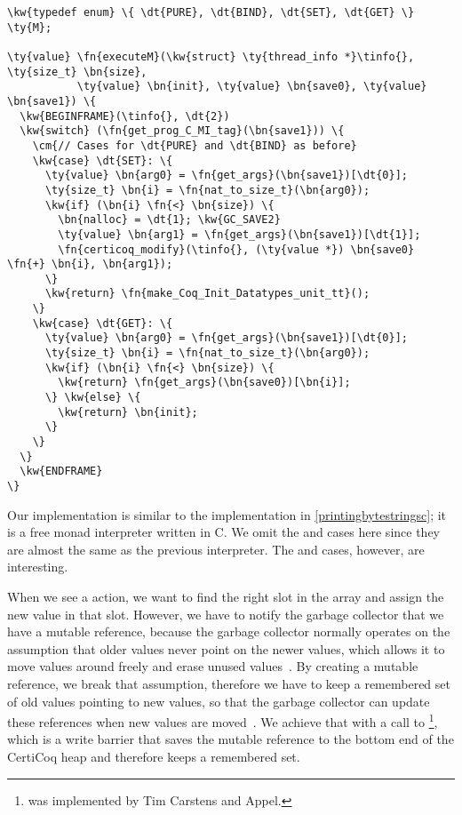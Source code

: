 \begin{Verbatim}
\kw{typedef enum} \{ \dt{PURE}, \dt{BIND}, \dt{SET}, \dt{GET} \} \ty{M};

\ty{value} \fn{executeM}(\kw{struct} \ty{thread_info *}\tinfo{}, \ty{size_t} \bn{size}, 
           \ty{value} \bn{init}, \ty{value} \bn{save0}, \ty{value} \bn{save1}) \{
  \kw{BEGINFRAME}(\tinfo{}, \dt{2})
  \kw{switch} (\fn{get_prog_C_MI_tag}(\bn{save1})) \{
    \cm{// Cases for \dt{PURE} and \dt{BIND} as before}
    \kw{case} \dt{SET}: \{
      \ty{value} \bn{arg0} = \fn{get_args}(\bn{save1})[\dt{0}];
      \ty{size_t} \bn{i} = \fn{nat_to_size_t}(\bn{arg0});
      \kw{if} (\bn{i} \fn{<} \bn{size}) \{
        \bn{nalloc} = \dt{1}; \kw{GC_SAVE2}
        \ty{value} \bn{arg1} = \fn{get_args}(\bn{save1})[\dt{1}];
        \fn{certicoq_modify}(\tinfo{}, (\ty{value *}) \bn{save0} \fn{+} \bn{i}, \bn{arg1});
      \}
      \kw{return} \fn{make_Coq_Init_Datatypes_unit_tt}();
    \}
    \kw{case} \dt{GET}: \{
      \ty{value} \bn{arg0} = \fn{get_args}(\bn{save1})[\dt{0}];
      \ty{size_t} \bn{i} = \fn{nat_to_size_t}(\bn{arg0});
      \kw{if} (\bn{i} \fn{<} \bn{size}) \{
        \kw{return} \fn{get_args}(\bn{save0})[\bn{i}];
      \} \kw{else} \{
        \kw{return} \bn{init};
      \}
    \}
  \}
  \kw{ENDFRAME}
\}
\end{Verbatim}

Our  implementation is similar to the  implementation in \autoref{printingbytestringsc}; it is a free monad interpreter written in C. We omit the  and  cases here since they are almost the same as the previous interpreter.
The  and  cases, however, are interesting.

When we see a  action, we want to find the right slot in the array and assign the new value in that slot. However, we have to notify the garbage collector that we have a mutable reference, because the garbage collector normally operates on the assumption that older values never point on the newer values, which allows it to move values around freely and erase unused values~\cite{fenichel1969lisp}. By creating a mutable reference, we break that assumption, therefore we have to keep a remembered set of old values pointing to new values, so that the garbage collector can update these references when new values are moved~\cite{sansom1993generational}. We achieve that with a call to \footnote{ was implemented by Tim Carstens and Appel.}, which is a write barrier that saves the mutable reference to the bottom end of the \gls{CertiCoq heap} and therefore keeps a remembered set. 

